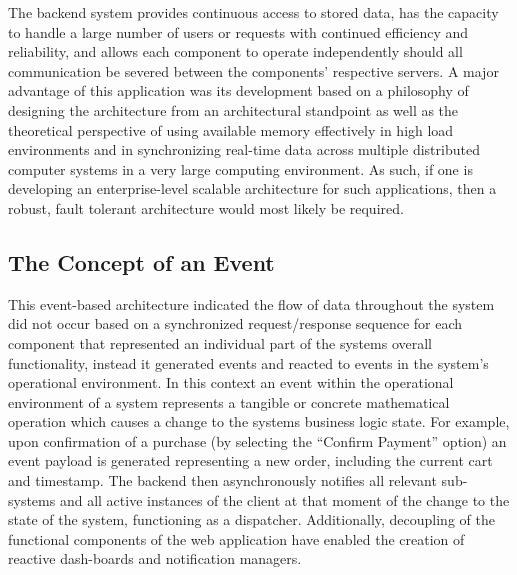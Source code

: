 The backend system provides continuous access to stored data, has the capacity to handle a large number of users or requests with continued efficiency and reliability, and allows each component to operate independently should all communication be severed between the components' respective servers. A major advantage of this application was its development based on a philosophy of designing the architecture from an architectural standpoint as well as the theoretical perspective of using available memory effectively in high load environments and in synchronizing real-time data across multiple distributed computer systems in a very large computing environment. As such, if one is developing an enterprise-level scalable architecture for such applications, then a robust, fault tolerant architecture would most likely be required.

\subsection{The Concept of an Event}
This event-based architecture indicated the flow of data throughout the system did not occur based on a synchronized request/response sequence for each component that represented an individual part of the systems overall functionality, instead it generated events and reacted to events in the system's operational environment. In this context an event within the operational environment of a system represents a tangible or concrete mathematical operation which causes a change to the systems business logic state. For example, upon confirmation of a purchase (by selecting the ``Confirm Payment'' option) an event payload is generated representing a new order, including the current cart and timestamp. The backend then asynchronously notifies all relevant sub-systems and all active instances of the client at that moment of the change to the state of the system, functioning as a dispatcher. Additionally, decoupling of the functional components of the web application have enabled the creation of reactive dash-boards and notification managers.

